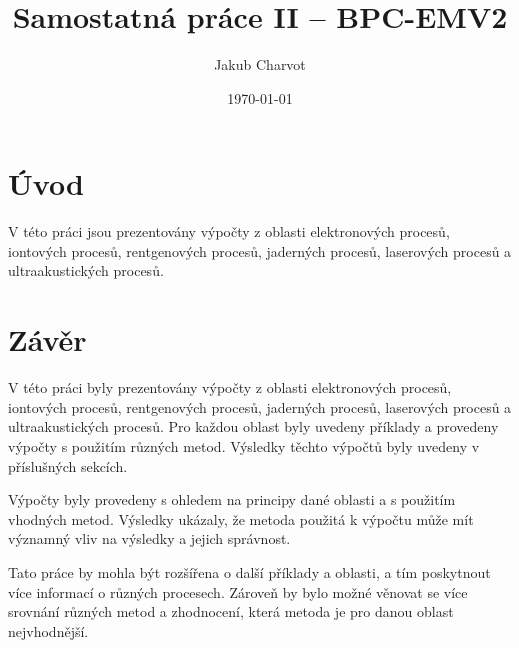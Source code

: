 \documentclass[a4paper,onecolumn,12pt]{article}
\begin{document}
\setlength{\textwidth}{\paperwidth-5cm}
\title{Samostatná práce II – BPC-EMV2}
\author{Jakub Charvot}
\date{\czdate\today}
\maketitle

\section*{Úvod}

V této práci jsou prezentovány výpočty z oblasti elektronových procesů, iontových procesů, rentgenových procesů, jaderných procesů, laserových procesů a ultraakustických procesů.















\section*{Závěr}

V této práci byly prezentovány výpočty z oblasti elektronových procesů, iontových procesů, rentgenových procesů, 
jaderných procesů, laserových procesů a ultraakustických procesů. Pro každou oblast byly uvedeny příklady a provedeny výpočty s použitím různých metod. Výsledky těchto výpočtů byly uvedeny v příslušných sekcích.

Výpočty byly provedeny s ohledem na principy dané oblasti a s použitím vhodných metod. Výsledky ukázaly, že metoda použitá k výpočtu může mít významný vliv na výsledky a jejich správnost.

Tato práce by mohla být rozšířena o další příklady a oblasti, a tím poskytnout více informací o různých procesech. Zároveň by bylo možné věnovat se více srovnání různých metod a zhodnocení, která metoda je pro danou oblast nejvhodnější.
\end{document}
